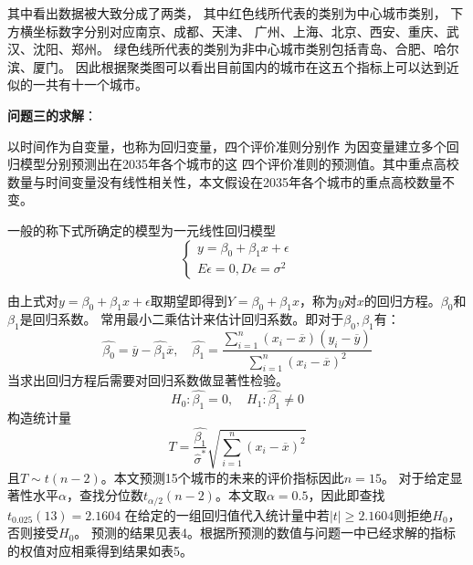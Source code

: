 \documentclass[openany,oneside]{ctexbook}
\begin{document}
其中看出数据被大致分成了两类，
其中红色线所代表的类别为中心城市类别，
下方横坐标数字分别对应南京、成都、天津、
广州、上海、北京、西安、重庆、武汉、沈阳、郑州。
绿色线所代表的类别为非中心城市类别包括青岛、合肥、哈尔滨、厦门。
因此根据聚类图可以看出目前国内的城市在这五个指标上可以达到近似的一共有十一个城市。




{\bfseries 问题三的求解}：

以时间作为自变量，也称为回归变量，四个评价准则分别作
为因变量建立多个回归模型分别预测出在2035年各个城市的这
四个评价准则的预测值。其中重点高校数量与时间变量没有线性相关性，本文假设在2035年各个城市的重点高校数量不变。


一般的称下式所确定的模型为一元线性回归模型
\[
   \left\{\begin{matrix}
      y=\beta_0+\beta_1 x+\epsilon\\ 
      E\epsilon=0,D\epsilon={\sigma}^2
      \end{matrix}\right.
\]

由上式对$y=\beta_0+\beta_1 x+\epsilon$取期望即得到$Y=\beta_0+\beta_1 x$，称为$y$对$x$的回归方程。$\beta_0$和$\beta_1$是回归系数。
常用最小二乘估计来估计回归系数。即对于$\beta_0,\beta_1$有：
\[
   \hat{\beta_0}=\overline{y}-\hat{\beta_1}\overline{x},\quad \hat{\beta_1}=\displaystyle\frac{\displaystyle\sum_{i=1}^{n}(x_{i}-\overline{x})(y_{i}-\overline{y})}{\displaystyle\sum_{i=1}^{n}{(x_i-\overline{x})}^2}
\]
当求出回归方程后需要对回归系数做显著性检验。
\[
   H_0:\hat{\beta_1}=0,\quad H_1: \hat{\beta_1}\neq 0
\]
构造统计量
\[
   T=\displaystyle\frac{\hat{\beta_1}}{\hat{{}\sigma}^*}\sqrt{\displaystyle\sum_{i=1}^{n}{(x_i-\overline{x})}^2}
\]
且$T \sim t(n-2)$。本文预测15个城市的未来的评价指标因此$n=15$。
对于给定显著性水平$\alpha$，查找分位数$t_{\alpha/2}(n-2)$。本文取$\alpha=0.5$，因此即查找$t_{0.025}(13)=2.1604$
在给定的一组回归值代入统计量中若$|t|\geqslant 2.1604$则拒绝$H_0$，否则接受$H_0$。
预测的结果见表4。根据所预测的数值与问题一中已经求解的指标的权值对应相乘得到结果如表5。
\end{document}
